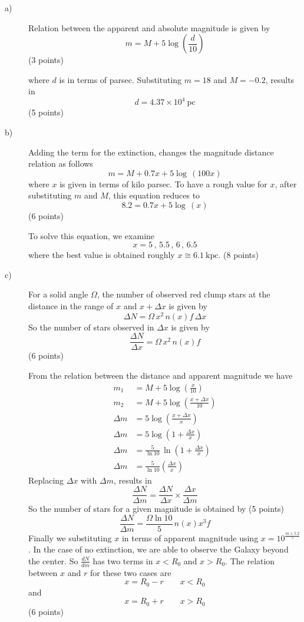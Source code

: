 \begin{description}
\item[a)] Relation between the apparent and absolute magnitude is given by
  \[
    m = M + 5\log\left(\frac{d}{10}\right)
  \]
  \hfill(3 points)

  where $d$ is in terms of parsec. Substituting $m = 18$ and $M = -0.2$,
  results in
  \[
    d = 4.37\times10^{4}\ \mathrm{pc}
  \]
  \hfill(5 points)
\item[b)] Adding the term for the extinction, changes the magnitude distance
  relation as follows
  \[
    m = M + 0.7x + 5\log\,(100x)
  \]
  where $x$ is given in terms of kilo parsec. To have a rough value for $x$,
  after substituting $m$ and $M$, this equation reduces to
  \[
    8.2 = 0.7x + 5\log\,(x)
  \]
  \hfill(6 points)

  To solve this equation, we examine
  \[
    x = 5\,,\,5.5\,,\,6\,,\,6.5
  \]
  where the best value is obtained roughly $x \cong 6.1\ \mathrm{kpc}$.
  \hfill(8 points)
\item[c)] For a solid angle $\Omega$, the number of observed red clump stars
  at the distance in the range of $x$ and $x + \Delta x$ is given by
  \[
    \Delta N = \Omega\,x^2\,n(x)f\,\Delta x
  \]
  So the number of stars observed in $\Delta x$ is given by
  \[
    \frac{\Delta N}{\Delta x} = \Omega\,x^2\,n(x)f
  \]
  \hfill(6 points)

  From the relation between the distance and apparent magnitude we have
  \begin{align*}
    m_1 &= M + 5\log\left(\frac{x}{10}\right)\\
    m_2 &= M + 5\log\left(\frac{x+\Delta x}{10}\right)\\
    \Delta m &= 5\log\left(\frac{x+\Delta x}{x}\right)\\
    \Delta m &= 5\log\left(1 + \frac{\Delta x}{x}\right)\\
    \Delta m &= \frac{5}{\ln 10}\,\ln\left(1 + \frac{\Delta x}{x}\right)\\
    \Delta m &= \frac{5}{\ln 10}\left(\frac{\Delta x}{x}\right)
  \end{align*}
  Replacing $\Delta x$ with $\Delta m$, results in
  \[
    \frac{\Delta N}{\Delta m}
      = \frac{\Delta N}{\Delta x}\times\frac{\Delta x}{\Delta m}
  \]
  So the number of stars for a given magnitude is obtained by \hfill(5 points)
  \[
    \frac{\Delta N}{\Delta m} = \frac{\Omega \ln 10}{5}\,n(x)x^3 f
  \]
  Finally we substituting %
  $x$ in terms of apparent magnitude using $x = 10^{\frac{m+5.2}{5}}$.
  In the case of no extinction, we are able to observe the Galaxy beyond the
  center. So $\frac{dN}{dm}$ has two terms in $x < R_0$ and $x > R_0$. The
  relation between $x$ and $r$ for these two cases are
  \[
    x = R_0 - r \qquad x < R_0
  \]
  and
  \[
    x = R_0 + r \qquad x > R_0
  \]
  \hfill(6 points)


\end{description}
